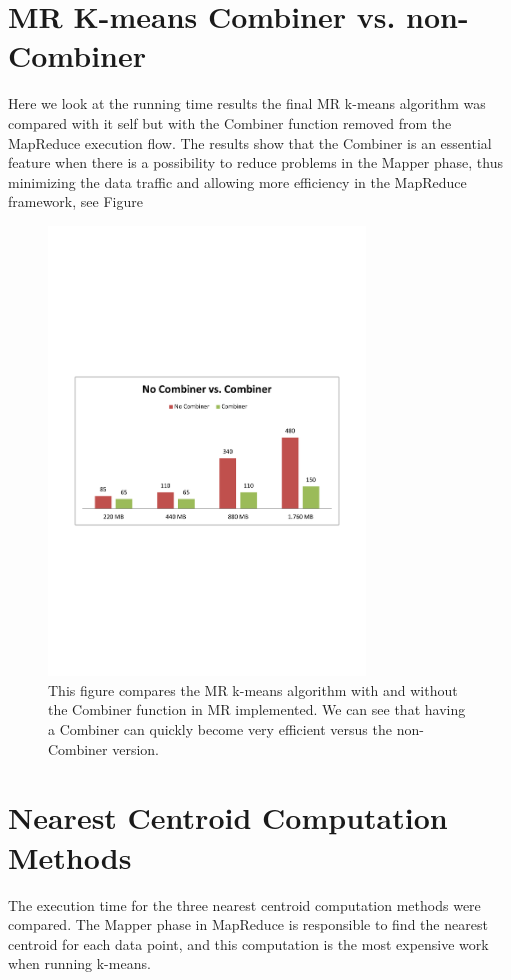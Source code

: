 \newpage
\section{MR K-means Combiner vs. non-Combiner}
Here we look at the running time results the final MR k-means algorithm was compared with it self but with the Combiner function removed from the MapReduce execution flow. The results show that the Combiner is an essential feature when there is a possibility to reduce problems in the Mapper phase, thus minimizing the data traffic and allowing more efficiency in the MapReduce framework, see Figure

\begin{figure}[ht]
\centering
\includegraphics[trim = 10mm 90mm 10mm 90mm, clip, width=0.75\textwidth]{Figures/experiments/combiner.pdf}
\caption{This figure compares the MR k-means algorithm with and without the Combiner function in MR implemented. We can see that having a Combiner can quickly become very efficient versus the non-Combiner version. }
\label{fig:results_combiner}
\end{figure}

\newpage
\section{Nearest Centroid Computation Methods}
The execution time for the three nearest centroid computation methods were compared. The Mapper phase in MapReduce is responsible to find the nearest centroid for each data point, and this computation is the most expensive work when running k-means.

